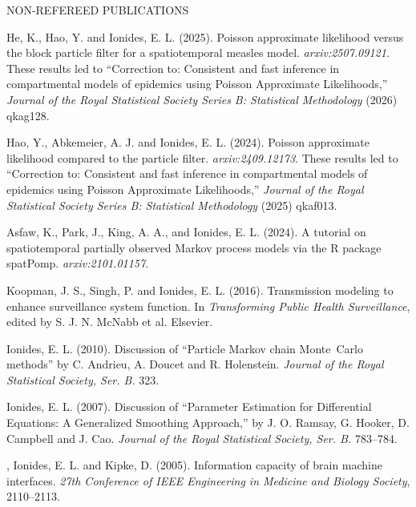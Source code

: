 \lsp


\begin{reflist} {NON-REFEREED PUBLICATIONS}

\item He, K., Hao, Y. and Ionides, E. L. (2025). Poisson approximate likelihood versus the block particle filter for a spatiotemporal measles model. {\it arxiv:2507.09121}. These results led to ``Correction to: Consistent and fast inference in compartmental models of epidemics using Poisson Approximate Likelihoods,'' {\it Journal of the Royal Statistical Society Series B: Statistical Methodology} (2026) qkag128.

\item Hao, Y., Abkemeier, A. J. and Ionides, E. L. (2024). Poisson approximate likelihood compared to the particle filter. {\it arxiv:2409.12173}. These results led to ``Correction to: Consistent and fast inference in compartmental models of epidemics using Poisson Approximate Likelihoods,'' {\it Journal of the Royal Statistical Society Series B: Statistical Methodology} (2025) qkaf013.
  
\item Asfaw, K., Park, J., King, A. A., and Ionides, E. L. (2024). A tutorial on spatiotemporal partially observed Markov process models via the R package spatPomp. {\it arxiv:2101.01157}.
  
\item
Koopman, J. S., Singh, P. and Ionides, E. L. (2016). Transmission modeling to enhance surveillance system function. In {\em Transforming Public Health Surveillance}, edited by S. J. N. McNabb et al. Elsevier.

\item\formal{[[\ionidesJRSSBb] ]} 
Ionides, E. L. (2010). Discussion of ``Particle Markov chain Monte~Carlo methods'' by C. Andrieu, A. Doucet and R. Holenstein.
{\em Journal of the Royal Statistical Society, Ser. B.} {}{\separator}323.

\item\formal{[[\ionidesJRSSBa] ]}  
Ionides, E. L. (2007). Discussion of ``Parameter Estimation for Differential Equations: A Generalized Smoothing Approach,'' by J. O. Ramsay, G. Hooker, D. Campbell and J. Cao. 
{\em Journal of the Royal Statistical Society, Ser. B.} {}{\separator}783--784.

\item\formal{[[\gageEMBS] ]}  
, Ionides, E. L. and
  Kipke, D. (2005). Information capacity of brain machine
  interfaces. {\em 27th Conference of IEEE Engineering in
  Medicine and Biology Society}, 2110--2113.


\end{reflist}

